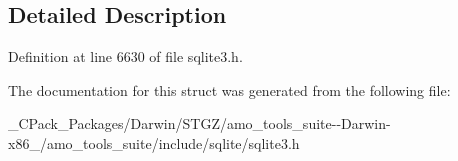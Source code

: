 \subsection{Detailed Description}


Definition at line 6630 of file sqlite3.\+h.



The documentation for this struct was generated from the following file\+:\begin{DoxyCompactItemize}
\item 
\+\_\+\+C\+Pack\+\_\+\+Packages/\+Darwin/\+S\+T\+G\+Z/amo\+\_\+tools\+\_\+suite-\/-\/\+Darwin-\/x86\+\_/amo\+\_\+tools\+\_\+suite/include/sqlite/sqlite3.\+h\end{DoxyCompactItemize}
